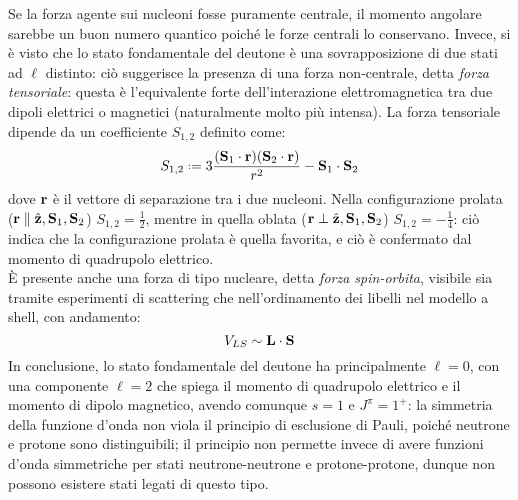 Se la forza agente sui nucleoni fosse puramente centrale, il momento angolare sarebbe un buon numero quantico poiché le forze centrali lo conservano. Invece, si è visto che lo stato fondamentale del deutone è una sovrapposizione di due stati ad $ \ell $ distinto: ciò suggerisce la presenza di una forza non-centrale, detta \textit{forza tensoriale}: questa è l'equivalente forte dell'interazione elettromagnetica tra due dipoli elettrici o magnetici (naturalmente molto più intensa). La forza tensoriale dipende da un coefficiente $ S_{1,2} $ definito come:
\begin{equation}
	S_{1,2} \defeq 3 \frac{(\ve{S}_1 \cdot \ve{r}) (\ve{S}_2 \cdot \ve{r})}{r^2} - \ve{S}_1 \cdot \ve{S}_2
	\label{eq:4.19}
\end{equation}
dove $ \mathbf{r} $ è il vettore di separazione tra i due nucleoni. Nella configurazione prolata ($ \mathbf{r} \parallel \hat{\mathbf{z}},\mathbf{S}_1,\mathbf{S}_2 $) $ S_{1,2} = \frac{1}{2} $, mentre in quella oblata ($ \mathbf{r} \perp \hat{\mathbf{z}},\mathbf{S}_1,\mathbf{S}_2 $) $ S_{1,2} = - \frac{1}{4} $: ciò indica che la configurazione prolata è quella favorita, e ciò è confermato dal momento di quadrupolo elettrico.\\
È presente anche una forza di tipo nucleare, detta \textit{forza spin-orbita}, visibile sia tramite esperimenti di scattering che nell'ordinamento dei libelli nel modello a shell, con andamento:
\begin{equation}
	V_{LS} \sim \mathbf{L} \cdot \mathbf{S}
	\label{eq:4.20}
\end{equation}
In conclusione, lo stato fondamentale del deutone ha principalmente $ \ell = 0 $, con una componente $ \ell = 2 $ che spiega il momento di quadrupolo elettrico e il momento di dipolo magnetico, avendo comunque $ s = 1 $ e $ J^{\pi} = 1^+ $: la simmetria della funzione d'onda non viola il principio di esclusione di Pauli, poiché neutrone e protone sono distinguibili; il principio non permette invece di avere funzioni d'onda simmetriche per stati neutrone-neutrone e protone-protone, dunque non possono esistere stati legati di questo tipo.










